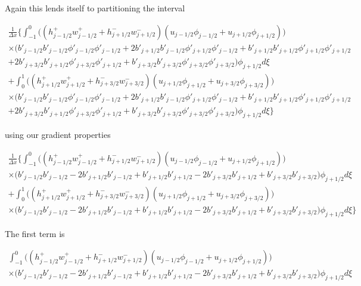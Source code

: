 \documentclass[12pt]{article}
\begin{document}
Again this lends itself to partitioning the interval

\begin{multline*}
\frac{1}{\Delta x} \bigg\lbrace \int_{-1}^{0} \bigg(\left(h^+_{j-1/2} w^+_{j-1/2} + h^-_{j+1/2} w^-_{j+1/2} \right)\left(u_{j-1/2} \phi_{j-1/2} +  u_{j+1/2} \phi_{j+1/2} \right)\bigg)\\\times \big(b'_{j-1/2}b'_{j-1/2} \phi'_{j-1/2} \phi'_{j-1/2} +  2b'_{j+1/2}b'_{j-1/2} \phi'_{j+1/2}\phi'_{j-1/2} + b'_{j+1/2}b'_{j+1/2} \phi'_{j+1/2}\phi'_{j+1/2} \\ + 2b'_{j+3/2}b'_{j+1/2} \phi'_{j+3/2} \phi'_{j+1/2} +  b'_{j+3/2}b'_{j+3/2} \phi'_{j+3/2} \phi'_{j+3/2} \big)\phi_{j +1/2} d \xi
\\+ \int_{0}^{1} \bigg(\left( h^+_{j+1/2} w^+_{j+1/2} + h^-_{j+3/2} w^-_{j+3/2}\right)\left(u_{j+1/2} \phi_{j+1/2} + u_{j+3/2} \phi_{j+3/2} \right) \bigg)\\\times \big(b'_{j-1/2}b'_{j-1/2} \phi'_{j-1/2} \phi'_{j-1/2} +  2b'_{j+1/2}b'_{j-1/2} \phi'_{j+1/2}\phi'_{j-1/2} + b'_{j+1/2}b'_{j+1/2} \phi'_{j+1/2}\phi'_{j+1/2} \\ + 2b'_{j+3/2}b'_{j+1/2} \phi'_{j+3/2} \phi'_{j+1/2} +  b'_{j+3/2}b'_{j+3/2} \phi'_{j+3/2} \phi'_{j+3/2} \big)\phi_{j +1/2} d \xi \bigg\rbrace
\end{multline*}

using our gradient properties

\begin{multline*}
\frac{1}{\Delta x} \bigg\lbrace \int_{-1}^{0} \bigg(\left(h^+_{j-1/2} w^+_{j-1/2} + h^-_{j+1/2} w^-_{j+1/2} \right)\left(u_{j-1/2} \phi_{j-1/2} +  u_{j+1/2} \phi_{j+1/2} \right)\bigg)\\\times \big(b'_{j-1/2}b'_{j-1/2} - 2b'_{j+1/2}b'_{j-1/2}+ b'_{j+1/2}b'_{j+1/2}  - 2b'_{j+3/2}b'_{j+1/2}  +  b'_{j+3/2}b'_{j+3/2} \big)\phi_{j +1/2} d \xi
\\+ \int_{0}^{1} \bigg(\left( h^+_{j+1/2} w^+_{j+1/2} + h^-_{j+3/2} w^-_{j+3/2}\right)\left(u_{j+1/2} \phi_{j+1/2} + u_{j+3/2} \phi_{j+3/2} \right) \bigg)\\\times \big(b'_{j-1/2}b'_{j-1/2} -  2b'_{j+1/2}b'_{j-1/2} + b'_{j+1/2}b'_{j+1/2} - 2b'_{j+3/2}b'_{j+1/2}  +  b'_{j+3/2}b'_{j+3/2} \big)\phi_{j +1/2} d \xi \bigg\rbrace
\end{multline*}

The first term is 

\begin{multline*}
\int_{-1}^{0} \bigg(\left(h^+_{j-1/2} w^+_{j-1/2} + h^-_{j+1/2} w^-_{j+1/2} \right)\left(u_{j-1/2} \phi_{j-1/2} +  u_{j+1/2} \phi_{j+1/2} \right)\bigg)\\\times \big(b'_{j-1/2}b'_{j-1/2} - 2b'_{j+1/2}b'_{j-1/2}+ b'_{j+1/2}b'_{j+1/2}  - 2b'_{j+3/2}b'_{j+1/2}  +  b'_{j+3/2}b'_{j+3/2} \big)\phi_{j +1/2} d \xi
\end{multline*}
\end{document}
